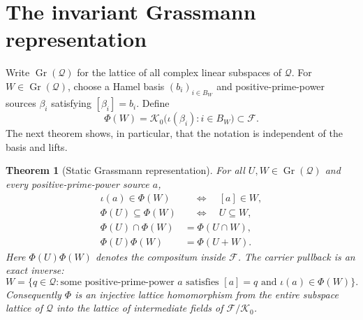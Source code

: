 \documentclass[11pt]{article}
\newtheorem{theorem}{Theorem}[section]
\theoremstyle{definition}
\theoremstyle{remark}
\newcommand{\cF}{\mathcal F}
\newcommand{\cK}{\mathcal K}
\newcommand{\cQ}{\mathcal Q}
\begin{document}
\section{The invariant Grassmann representation}\label{sec:master}

Write \(\operatorname{Gr}(\cQ)\) for the lattice of all complex linear subspaces of \(\cQ\).
For \(W\in\operatorname{Gr}(\cQ)\), choose a Hamel basis \((b_i)_{i\in B_W}\) and
positive-prime-power sources \(\beta_i\) satisfying \([\beta_i]=b_i\).  Define
\begin{equation}\label{eq:Phi}
  \Phi(W)=\cK_0\bigl(\iota(\beta_i):i\in B_W\bigr)\subset\cF.
\end{equation}
The next theorem shows, in particular, that the notation is independent of the basis and lifts.

\begin{theorem}[Static Grassmann representation]\label{thm:static-grassmann}
For all \(U,W\in\operatorname{Gr}(\cQ)\) and every positive-prime-power source \(a\),
\begin{align}
  \iota(a)\in\Phi(W)&\quad\Longleftrightarrow\quad [a]\in W,
    \label{eq:Phi-membership}\\
  \Phi(U)\subseteq\Phi(W)&\quad\Longleftrightarrow\quad U\subseteq W,
    \label{eq:Phi-order}\\
  \Phi(U)\cap\Phi(W)&=\Phi(U\cap W),
    \label{eq:Phi-meet}\\
  \Phi(U)\Phi(W)&=\Phi(U+W).
    \label{eq:Phi-join}
\end{align}
Here \(\Phi(U)\Phi(W)\) denotes the compositum inside \(\cF\).  The carrier pullback is an
exact inverse:
\begin{equation}\label{eq:Phi-pullback}
 W=\{q\in\cQ:\text{some positive-prime-power }a\text{ satisfies }
 [a]=q\text{ and }\iota(a)\in\Phi(W)\}.
\end{equation}
Consequently \(\Phi\) is an injective lattice homomorphism from the entire subspace lattice of
\(\cQ\) into the lattice of intermediate fields of \(\cF/\cK_0\).
\end{theorem}
\end{document}
